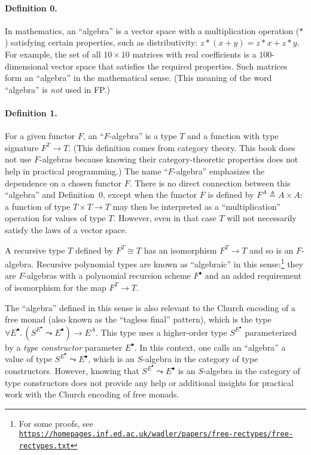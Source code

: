 \paragraph{Definition 0.}

In mathematics, an \textquotedblleft algebra\textquotedblright{} is
a vector space with a multiplication operation ($*$) satisfying certain
properties, such as distributivity: $z*(x+y)=z*x+z*y$. For example,
the set of all $10\times10$ matrices with real coefficients is a
$100$-dimensional vector space that satisfies the required properties.
Such matrices form an \textquotedblleft algebra\textquotedblright{}
in the mathematical sense. (This meaning of the word \textsf{``}algebra\textsf{''}
is \emph{not} used in FP.)

\paragraph{Definition 1.}

For a given functor $F$, an \textsf{``}$F$-algebra\textsf{''}
is a type $T$ and a function with type signature $F^{T}\rightarrow T$.
(This definition comes from category theory. This book does not use
$F$-algebras because knowing their category-theoretic properties
does not help in practical programming.) The name \textsf{``}$F$-algebra\textsf{''}
emphasizes the dependence on a chosen functor $F$. There is no direct
connection between this \textsf{``}algebra\textsf{''} and Definition~0, except when
the functor $F$ is defined by $F^{A}\triangleq A\times A$: a function
of type $T\times T\rightarrow T$ may then be interpreted as a \textsf{``}multiplication\textsf{''}
operation for values of type $T$. However, even in that case $T$
will not necessarily satisfy the laws of a vector space.

A recursive type $T$ defined by $F^{T}\cong T$ has an isomorphism
$F^{T}\rightarrow T$ and so is an $F$-algebra. Recursive polynomial
types are known as \textsf{``}algebraic\textsf{''} in this sense:\footnote{For some proofs, see \texttt{\href{https://homepages.inf.ed.ac.uk/wadler/papers/free-rectypes/free-rectypes.txt}{https://homepages.inf.ed.ac.uk/wadler/papers/free-rectypes/free-rectypes.txt}} }
they are $F$-algebras with a polynomial recursion scheme $F^{\bullet}$
and an added requirement of isomorphism for the map $F^{T}\rightarrow T$.

The \textsf{``}algebra\textsf{''} defined in this sense is also relevant to the Church
encoding of a free monad (also known as the \textsf{``}tagless final\textsf{''}
pattern), which is the type $\forall E^{\bullet}.\,(S^{E^{\bullet}}\leadsto E^{\bullet})\rightarrow E^{A}$.
This type uses a higher-order type $S^{E^{\bullet}}$ parameterized
by a \emph{type constructor} parameter $E^{\bullet}$. In this context,
one calls an \textsf{``}algebra\textsf{''} a value of type $S^{E^{\bullet}}\leadsto E^{\bullet}$,
which is an $S$-algebra in the category of type constructors. However,
knowing that $S^{E^{\bullet}}\leadsto E^{\bullet}$ is an $S$-algebra
in the category of type constructors does not provide any help or
additional insights for practical work with the Church encoding of
free monads.


